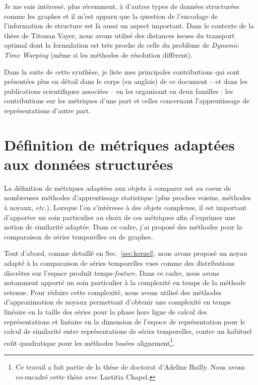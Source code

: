 Je me suis intéressé, plus récemment, à d'autres types de données structurées
comme les graphes et il m'est apparu que la question de l'encodage de
l'information de structure est là aussi un aspect important.
Dans le contexte de la thèse de Titouan Vayer, nous avons utilisé des
distances issues du transport optimal dont la formulation est très proche de
celle du problème de \emph{Dynamic Time Warping} (même si les méthodes de
résolution diffèrent).

Dans la suite de cette synthèse, je liste mes principales contributions
qui sont présentées plus en détail dans le corps (en anglais) de ce document
-- et dans les publications scientifiques associées -- en les organisant en
deux familles : les contributions sur les métriques d'une part et celles
concernant l'apprentissage de représentations d'autre part.

\section*{Définition de métriques adaptées aux données structurées}

La définition de métriques adaptées aux objets à comparer est au coeur de
nombreuses méthodes d'apprentissage statistique (plus proches voisins,
méthodes à noyaux, \emph{etc.}).
Lorsque l'on s'intéresse à des objets complexes, il est important d'apporter
un soin particulier au choix de ces métriques afin d'exprimer une notion
de similarité adaptée.
Dans ce cadre, j'ai proposé des méthodes pour la comparaison de séries
temporelles ou de graphes.

\haveabreak{}

Tout d'abord, comme detaillé en Sec.~\ref{sec:kernel}, nous avons proposé un
noyau adapté à la comparaison de séries temporelles vues comme des
distributions discrètes sur l'espace produit temps-\emph{feature}.
Dans ce cadre, nous avons notamment apporté un soin particulier à la complexité
en temps de la méthode retenue.
Pour réduire cette complexité, nous avons utilisé des méthodes d'approximation
de noyaux permettant
d'obtenir une complexité en temps linéaire en la taille des séries pour la phase
hors ligne de calcul des représentations et linéaire en la dimension de l'espace
de représentation pour le calcul de similarité entre représentations de séries
temporelles, contre un habituel coût quadratique pour les méthodes basées
alignement\footnote{Ce travail a fait partie de la thèse de doctorat d'Adeline
Bailly. Nous avons co-encadré cette thèse avec Laetitia Chapel.}.

